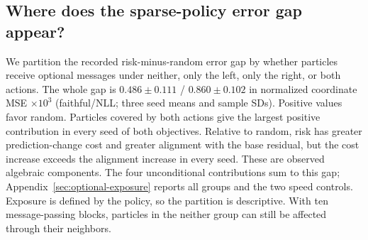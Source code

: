 \subsection{Where does the sparse-policy error gap appear?}
We partition the recorded risk-minus-random error gap by whether particles
receive optional messages under neither, only the left, only the right, or
both actions. The whole gap is $0.486\pm0.111$ / $0.860\pm0.102$
in normalized coordinate MSE $\times10^3$ (faithful/NLL; three seed means
and sample SDs). Positive values favor random.
Particles covered by both actions give the largest positive contribution
in every seed of both objectives.
Relative to random, risk has greater prediction-change cost and greater
alignment with the base residual, but the cost increase exceeds the
alignment increase in every seed. These are observed algebraic components.
The four unconditional contributions sum to this gap; Appendix~\ref{sec:optional-exposure} reports
all groups and the two speed controls. Exposure is defined by the policy,
so the partition is descriptive. With ten message-passing blocks, particles
in the neither group can still be affected through their neighbors.
